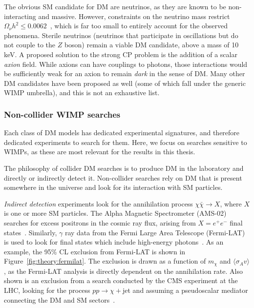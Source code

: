 The obvious SM candidate for DM are neutrinos, as they are known to be non-interacting and massive.
However, constraints on the neutrino mass restrict $\Omega_\nu h^2 \leq 0.0062$~\cite{pdg}, which is far too small to entirely account for the observed phenomena. 
Sterile neutrinos (neutrinos that participate in oscillations but do not couple to the $Z$ boson) remain a viable DM candidate, above a mass of 10 keV.
A proposed solution to the strong CP problem is the addition of a scalar \emph{axion} field.
While axions can have couplings to photons, those interactions would be sufficiently weak for an axion to remain \emph{dark} in the sense of DM.
Many other DM candidates have been proposed as well (some of which fall under the generic WIMP umbrella), and this is not an exhaustive list.

\subsubsection{Non-collider WIMP searches}

Each class of DM models has dedicated experimental signatures, and therefore dedicated experiments to search for them.
Here, we focus on searches sensitive to WIMPs, as these are most relevant for the results in this thesis.

The philosophy of collider DM searches is to produce DM in the laboratory and directly or indirectly detect it.
Non-collider searches rely on DM that is present somewhere in the universe and look for its interaction with SM particles.

\emph{Indirect detection} experiments look for the annihilation process $\chi\bar\chi\rightarrow X$, where $X$ is one or more SM particles.
The Alpha Magnetic Spectrometer (AMS-02) searches for excess positrons in the cosmic ray flux, arising from $X=e^+e^-$ final states~\cite{ams}. 
Similarly, $\gamma$ ray data from the Fermi Large Area Telescope (Fermi-LAT) is used to look for final states which include high-energy photons~\cite{fermilat}.
As an example, the 95\% CL exclusion from Fermi-LAT is shown in Figure~\ref{fig:theory:fermilat}.
The exclusion is drawn as a function of $m_\chi$ and $\langle \sigma_A v\rangle$, as the Fermi-LAT analysis is directly dependent on the annihilation rate.
Also shown is an exclusion from a search conducted by the CMS experiment at the LHC, looking for the process $pp\rightarrow \chi+$jet and assuming a pseudoscalar mediator connecting the DM and SM sectors~\cite{monojet}.

